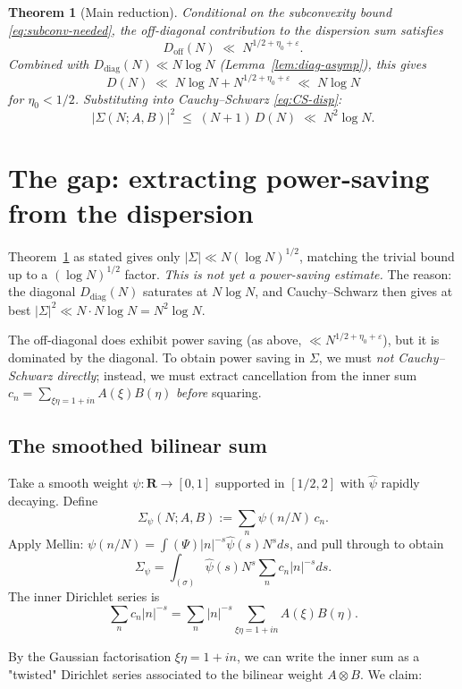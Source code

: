 \documentclass[11pt]{article}
\newtheorem{theorem}{Theorem}[section]
\theoremstyle{definition}
\newcommand{\R}{\mathbf{R}}
\begin{document}
\begin{theorem}[Main reduction]\label{thm:main-reduction}
Conditional on the subconvexity bound \eqref{eq:subconv-needed}, the off-diagonal contribution to the dispersion sum satisfies
\[
D_{\mathrm{off}}(N)\;\ll\;N^{1/2+\eta_0+\varepsilon}.
\]
Combined with $D_{\mathrm{diag}}(N)\ll N\log N$ (Lemma~\ref{lem:diag-asymp}), this gives
\[
D(N)\;\ll\;N\log N+N^{1/2+\eta_0+\varepsilon}\;\ll\;N\log N
\]
for $\eta_0<1/2$. Substituting into Cauchy--Schwarz \eqref{eq:CS-disp}:
\[
|\Sigma(N;A,B)|^2\;\le\;(N+1)\,D(N)\;\ll\;N^2\log N.
\]
\end{theorem}

\section{The gap: extracting power-saving from the dispersion}\label{sec:gap}

Theorem~\ref{thm:main-reduction} as stated gives only $|\Sigma|\ll N(\log N)^{1/2}$, matching the trivial bound up to a $(\log N)^{1/2}$ factor. \emph{This is not yet a power-saving estimate.} The reason: the diagonal $D_{\mathrm{diag}}(N)$ saturates at $N\log N$, and Cauchy--Schwarz then gives at best $|\Sigma|^2\ll N\cdot N\log N=N^2\log N$.

The off-diagonal does exhibit power saving (as above, $\ll N^{1/2+\eta_0+\varepsilon}$), but it is dominated by the diagonal. To obtain power saving in $\Sigma$, we must \emph{not Cauchy--Schwarz directly}; instead, we must extract cancellation from the inner sum $c_n=\sum_{\xi\eta=1+in}A(\xi)B(\eta)$ \emph{before} squaring.

\subsection{The smoothed bilinear sum}

Take a smooth weight $\psi:\R\to[0,1]$ supported in $[1/2,2]$ with $\widehat\psi$ rapidly decaying. Define
\[
\Sigma_\psi(N;A,B):=\sum_{n}\psi(n/N)\,c_n.
\]
Apply Mellin: $\psi(n/N)=\int(\Psi)|n|^{-s}\widehat\psi(s)N^s ds$, and pull through to obtain
\[
\Sigma_\psi=\int_{(\sigma)}\widehat\psi(s)N^s\sum_n c_n|n|^{-s}ds.
\]
The inner Dirichlet series is
\[
\sum_n c_n|n|^{-s}=\sum_n|n|^{-s}\sum_{\xi\eta=1+in}A(\xi)B(\eta).
\]

By the Gaussian factorisation $\xi\eta=1+in$, we can write the inner sum as a "twisted" Dirichlet series associated to the bilinear weight $A\otimes B$. We claim:
\end{document}
